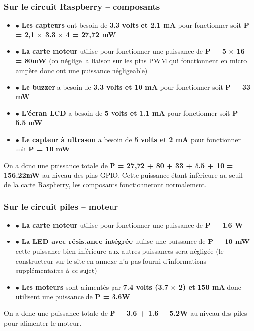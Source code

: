         \subsubsection{Sur le circuit Raspberry -- composants}
        \begin{itemize}
                \item $\bullet$ \textbf{Les capteurs} ont besoin de \textbf{3.3 volts et 2.1 mA} pour fonctionner soit \textbf{ P = 2,1 $\times$ 3.3 $\times$ 4 = 27,72 mW} 
                \item $\bullet$ \textbf{La carte moteur} utilise pour fonctionner une puissance de \textbf{ P = 5 $\times$ 16 = 80mW} (on néglige la liaison sur les pins PWM qui fonctionnent en micro ampère donc ont une puissance négligeable)
                \item $\bullet$ \textbf{Le buzzer} a besoin de \textbf{3.3 volts et 10 mA} pour fonctionner soit \textbf{ P = 33 mW} 
                \item $\bullet$ \textbf{L'écran LCD } a besoin de \textbf{5 volts et 1.1 mA} pour fonctionner soit \textbf{ P = 5.5 mW}
                \item $\bullet$ \textbf{Le capteur à ultrason } a besoin de \textbf{5 volts et 2 mA} pour fonctionner soit \textbf{ P = 10 mW}
                
        \end{itemize}
        On a donc une puissance totale de \textbf{P = 27,72 + 80 + 33 + 5.5 + 10 = 156.22mW} au niveau des pins GPIO. Cette puissance étant inférieure au seuil de la carte Raspberry, les composants fonctionneront normalement.
        \subsubsection{Sur le circuit piles -- moteur}
        \begin{itemize}
                \item $\bullet$ \textbf{La carte moteur} utilise pour fonctionner une puissance de \textbf{ P = 1.6 W}
                \item $\bullet$ \textbf{La LED avec résistance intégrée } utilise une puissance de \textbf{ P = 10 mW } cette puissance bien inférieure aux autres puissances sera négligée (le constructeur sur le site en annexe n'a pas fourni d'informations supplémentaires à ce sujet)
                \item $\bullet$ \textbf{Les moteurs } sont alimentés par \textbf{7.4 volts (3.7 $\times$ 2) et 150 mA} donc utilisent une puissance de \textbf{ P = 3.6W }
        \end{itemize}
        
        On a donc une puissance totale de \textbf{P = 3.6 + 1.6 = 5.2W} au niveau des piles pour alimenter le moteur. 
